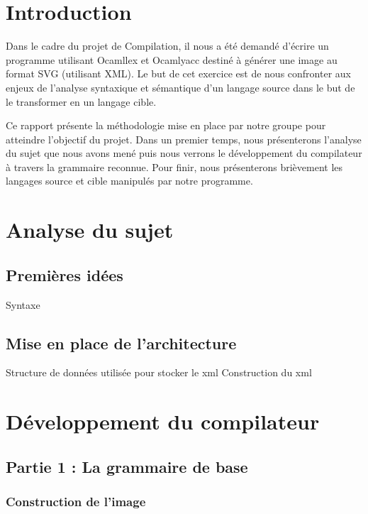 
\chapter*{Introduction}
	Dans le cadre du projet de Compilation, il nous a été demandé d'écrire un programme utilisant Ocamllex et Ocamlyacc destiné à générer une image au format SVG (utilisant XML). Le but de cet exercice est de nous confronter aux enjeux de l'analyse syntaxique et sémantique d'un langage source dans le but de le transformer en un langage cible.
	
	Ce rapport présente la méthodologie mise en place par notre groupe pour atteindre l'objectif du projet. Dans un premier temps, nous présenterons l'analyse du sujet que nous avons mené puis nous verrons le développement du compilateur à travers la grammaire reconnue. Pour finir, nous présenterons brièvement les langages source et cible manipulés par notre programme.

\chapter{Analyse du sujet}

	\section{Premières idées}
	Syntaxe
	
	\section{Mise en place de l'architecture}
	Structure de données utilisée pour stocker le xml 
	Construction du xml
	
	
	
\chapter{Développement du compilateur}
	
	\section{Partie 1 : La grammaire de base}

		\subsection{Construction de l'image}

